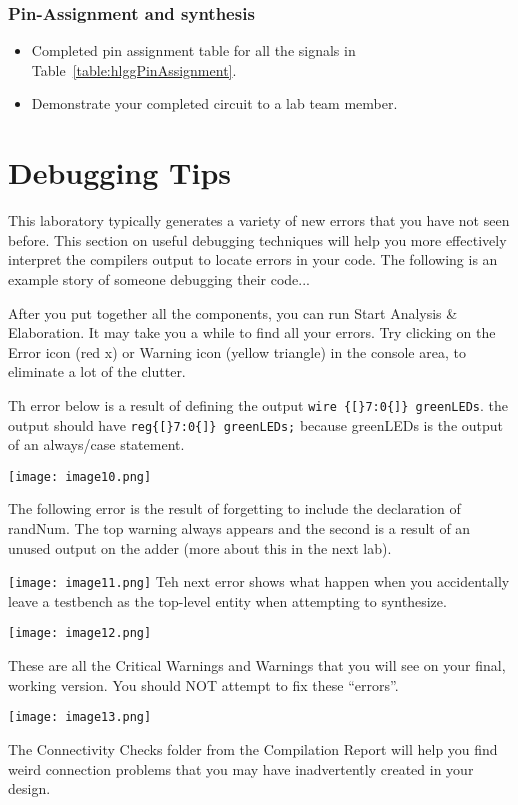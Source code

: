 \subsubsection{Pin-Assignment and synthesis}

\begin{itemize}
\item Completed pin assignment table for all the signals in Table~\ref{table:hlggPinAssignment}.
\item Demonstrate your completed circuit to a lab team member.
\end{itemize}

\section{Debugging Tips}
\label{section:guessGameDebugging}
This laboratory typically generates a variety of new errors that you
have not seen before.  This section on useful debugging techniques
will help you more effectively
interpret the compilers output to locate errors in your code.
The following is an example story of someone debugging their code...

After you put together all the components, you can run Start Analysis \&
Elaboration. It may take you a while to find all your errors.  Try
clicking on the Error icon (red x) or Warning icon (yellow
triangle) in the console area, to eliminate a lot of the clutter.

Th error below is a result of defining the output \verb+wire {[}7:0{]} greenLEDs+.
the output should have  \verb+reg{[}7:0{]} greenLEDs;+ because greenLEDs is the
output of an always/case statement.

\texttt{[image: image10.png]}

The following error is the result of forgetting to include the declaration of randNum.
The top warning always appears and the second is a result of an unused output on
the adder (more about this in the next lab).

\texttt{[image: image11.png]}
Teh next error shows what happen when you accidentally leave a testbench as the
top-level entity when attempting to synthesize.

\texttt{[image: image12.png]}

These are all the Critical Warnings and Warnings that you will see on your final,
working version. You should NOT attempt to fix these ``errors''.

\texttt{[image: image13.png]}

The Connectivity Checks folder from the Compilation Report will help you
find weird connection problems that you may have inadvertently created
in your design.
